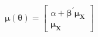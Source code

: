 \begin{equation}
	\boldsymbol{\mu}
	\left(
	\boldsymbol{\theta}
	\right)
	=
	\left[
		\begin{array}{c}
			\alpha                        
			+                             
			\boldsymbol{\beta}^{\prime}   
			\boldsymbol{\mu}_{\mathbf{X}} \\
			\boldsymbol{\mu}_{\mathbf{X}} 
		\end{array}
	\right]
	\label{eq:strRegression-mu-of-theta}
\end{equation}
